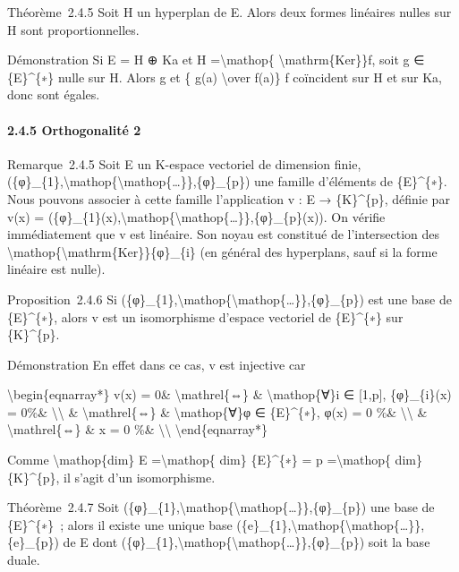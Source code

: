\documentclass[]{article}
\begin{document}
Théorème~2.4.5 Soit H un hyperplan de E. Alors deux formes linéaires
nulles sur H sont proportionnelles.

Démonstration Si E = H ⊕ Ka et H =\textbackslash{}mathop\{
\textbackslash{}mathrm\{Ker\}\}f, soit g ∈ \{E\}\^{}\{∗\} nulle sur H.
Alors g et \{ g(a) \textbackslash{}over f(a)\} f coïncident sur H et sur
Ka, donc sont égales.

\paragraph{2.4.5 Orthogonalité 2}

Remarque~2.4.5 Soit E un K-espace vectoriel de dimension finie,
(\{φ\}\_\{1\},\textbackslash{}mathop\{\textbackslash{}mathop\{\ldots{}\}\},\{φ\}\_\{p\})
une famille d'éléments de \{E\}\^{}\{∗\}. Nous pouvons associer à cette
famille l'application v : E → \{K\}\^{}\{p\}, définie par v(x) =
(\{φ\}\_\{1\}(x),\textbackslash{}mathop\{\textbackslash{}mathop\{\ldots{}\}\},\{φ\}\_\{p\}(x)).
On vérifie immédiatement que v est linéaire. Son noyau est constitué de
l'intersection des
\textbackslash{}mathop\{\textbackslash{}mathrm\{Ker\}\}\{φ\}\_\{i\} (en
général des hyperplans, sauf si la forme linéaire est nulle).

Proposition~2.4.6 Si
(\{φ\}\_\{1\},\textbackslash{}mathop\{\textbackslash{}mathop\{\ldots{}\}\},\{φ\}\_\{p\})
est une base de \{E\}\^{}\{∗\}, alors v est un isomorphisme d'espace
vectoriel de \{E\}\^{}\{∗\} sur \{K\}\^{}\{p\}.

Démonstration En effet dans ce cas, v est injective car

\textbackslash{}begin\{eqnarray*\} v(x) = 0\&
\textbackslash{}mathrel\{⇔\} \& \textbackslash{}mathop\{∀\}i ∈
{[}1,p{]}, \{φ\}\_\{i\}(x) = 0\%\& \textbackslash{}\textbackslash{} \&
\textbackslash{}mathrel\{⇔\} \& \textbackslash{}mathop\{∀\}φ ∈
\{E\}\^{}\{∗\}, φ(x) = 0 \%\& \textbackslash{}\textbackslash{} \&
\textbackslash{}mathrel\{⇔\} \& x = 0 \%\&
\textbackslash{}\textbackslash{} \textbackslash{}end\{eqnarray*\}

Comme \textbackslash{}mathop\{dim\} E =\textbackslash{}mathop\{ dim\}
\{E\}\^{}\{∗\} = p =\textbackslash{}mathop\{ dim\} \{K\}\^{}\{p\}, il
s'agit d'un isomorphisme.

Théorème~2.4.7 Soit
(\{φ\}\_\{1\},\textbackslash{}mathop\{\textbackslash{}mathop\{\ldots{}\}\},\{φ\}\_\{p\})
une base de \{E\}\^{}\{∗\}~; alors il existe une unique base
(\{e\}\_\{1\},\textbackslash{}mathop\{\textbackslash{}mathop\{\ldots{}\}\},\{e\}\_\{p\})
de E dont
(\{φ\}\_\{1\},\textbackslash{}mathop\{\textbackslash{}mathop\{\ldots{}\}\},\{φ\}\_\{p\})
soit la base duale.
\end{document}
